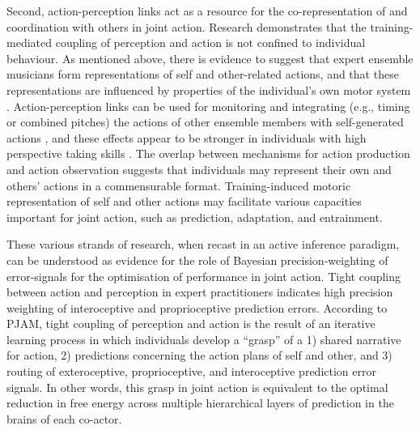 Second, action-perception links act as a resource for the co-representation of and coordination with others in joint action.
Research demonstrates that the training-mediated coupling of perception and action is not confined to individual behaviour.  As mentioned above, there is evidence to suggest that expert ensemble musicians form representations of self and other-related actions, and that these representations are influenced by properties of the individual’s own motor system \citep{Novembre2012}.  Action-perception links can be used for monitoring and integrating (e.g., timing or combined pitches) the actions of other ensemble members with self-generated actions \citep{Loehr2013}, and these effects appear to be stronger in individuals with high perspective taking skills \citep{Novembre2012,Loehr2013}.  The overlap between mechanisms for action production and action observation suggests that individuals may represent their own and others’ actions in a commensurable format.  Training-induced motoric representation of self and other actions may facilitate various capacities important for joint action, such as prediction, adaptation, and entrainment.

These various strands of research, when recast in an active inference paradigm, can be understood as evidence for the role of Bayesian precision-weighting of error-signals for the optimisation of performance in joint action.  Tight coupling between action and perception in expert practitioners indicates high precision weighting of interoceptive and proprioceptive prediction errors.   According to PJAM, tight coupling of perception and action is the result of an iterative learning process in which individuals develop a ``grasp'' of a 1) shared narrative for action, 2) predictions concerning the action plans of self and other, and 3) routing of exteroceptive, proprioceptive, and interoceptive prediction error signals.  In other words, this grasp in joint action is equivalent to the optimal reduction in free energy across multiple hierarchical layers of prediction in the brains of each co-actor.

